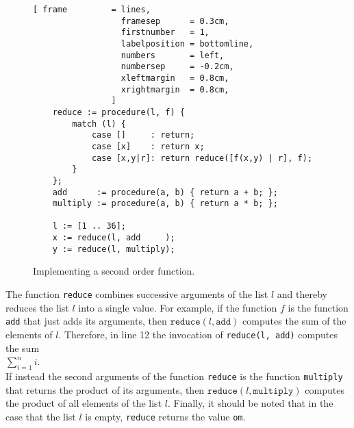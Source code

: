\begin{figure}[!ht]
\centering
\begin{Verbatim}[ frame         = lines, 
                  framesep      = 0.3cm, 
                  firstnumber   = 1,
                  labelposition = bottomline,
                  numbers       = left,
                  numbersep     = -0.2cm,
                  xleftmargin   = 0.8cm,
                  xrightmargin  = 0.8cm,
                ]
    reduce := procedure(l, f) {
        match (l) {
            case []     : return;
            case [x]    : return x;
            case [x,y|r]: return reduce([f(x,y) | r], f);
        }    
    };
    add      := procedure(a, b) { return a + b; };
    multiply := procedure(a, b) { return a * b; };
    
    l := [1 .. 36];
    x := reduce(l, add     );
    y := reduce(l, multiply);
\end{Verbatim}
\vspace*{-0.3cm}
\caption{Implementing a second order function.}
\label{fig:reduce.stlx}
\end{figure}
The function \texttt{reduce} combines successive arguments of the list $l$ and thereby reduces
the list $l$ into a single value.  For example, if the function $f$ is the function
\texttt{add} that just adds its arguments, then $\texttt{reduce}(l,
\texttt{add})$ computes the sum of
the elements of $l$.  Therefore, in line 12 the invocation of
\texttt{reduce(l, add)} computes the sum
\\[0.2cm]
\hspace*{1.3cm}
 $\sum\limits_{i=1}^n i$. 
\\[0.2cm] 
If instead the second arguments of the function \texttt{reduce} is the function
\texttt{multiply} that returns the product of its arguments, then 
$\texttt{reduce}(l, \texttt{multiply})$ computes the product of all elements of the list
$l$.  Finally, it should be noted that in the case that the list $l$ is empty,
\texttt{reduce} returns the value \texttt{om}. 



